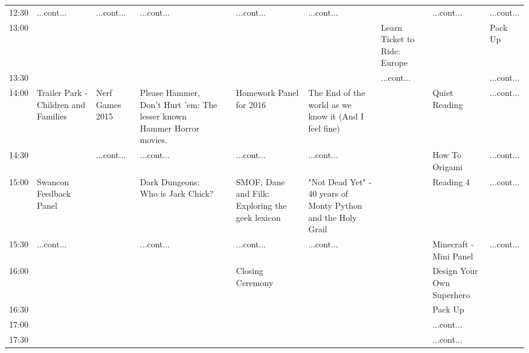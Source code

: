 \documentclass{scrreprt}
\begin{document}
\begin{landscape}
\begin{tabular}{c||p{25mm}|p{25mm}|p{25mm}|p{25mm}|p{25mm}|p{25mm}|p{25mm}|p{25mm}|p{25mm}|}
12:30&\cellcolor[gray]{0.959563} ...cont...&\cellcolor[gray]{0.822766} ...cont...&\cellcolor[gray]{0.536849} ...cont...&&\cellcolor[gray]{0.652774} ...cont...&\cellcolor[gray]{0.921723} ...cont...&&\cellcolor[gray]{0.933248} ...cont...&\cellcolor[gray]{0.511053} ...cont...\\
13:00&&&&&&&\cellcolor[gray]{0.990686} Learn Ticket to Ride: Europe&&\cellcolor[gray]{0.791956} Pack Up\\
13:30&&&&&&&\cellcolor[gray]{0.990686} ...cont...&&\cellcolor[gray]{0.791956} ...cont...\\
14:00&\cellcolor[gray]{0.975983} Trailer Park - Children and Families&\cellcolor[gray]{0.907521} Nerf Games 2015&\cellcolor[gray]{0.699067} Please Hammer, Don't Hurt 'em: The lesser known Hammer Horror movies.&&\cellcolor[gray]{0.630023} Homework Panel for 2016&\cellcolor[gray]{0.641491} The End of the world as we know it (And I feel fine)&&\cellcolor[gray]{0.787911} Quiet Reading&\cellcolor[gray]{0.791956} ...cont...\\
14:30&&\cellcolor[gray]{0.907521} ...cont...&\cellcolor[gray]{0.699067} ...cont...&&\cellcolor[gray]{0.630023} ...cont...&\cellcolor[gray]{0.641491} ...cont...&&\cellcolor[gray]{0.596810} How To Origami&\cellcolor[gray]{0.791956} ...cont...\\
15:00&\cellcolor[gray]{0.718915} Swancon Feedback Panel&&\cellcolor[gray]{0.702777} Dark Dungeons: Who is Jack Chick?&&\cellcolor[gray]{0.724284} SMOF, Dane and Filk: Exploring the geek lexicon&\cellcolor[gray]{0.798840} "Not Dead Yet" - 40 years of Monty Python and the Holy Grail&&\cellcolor[gray]{0.951650} Reading 4&\cellcolor[gray]{0.791956} ...cont...\\
15:30&\cellcolor[gray]{0.718915} ...cont...&&\cellcolor[gray]{0.702777} ...cont...&&\cellcolor[gray]{0.724284} ...cont...&\cellcolor[gray]{0.798840} ...cont...&&\cellcolor[gray]{0.973893} Minecraft - Mini Panel&\cellcolor[gray]{0.791956} ...cont...\\
16:00&&&&&\cellcolor[gray]{0.830238} Closing Ceremony&&&\cellcolor[gray]{0.693081} Design Your Own Superhero&\\
16:30&&&&&&&&\cellcolor[gray]{0.975113} Pack Up&\\
17:00&&&&&&&&\cellcolor[gray]{0.975113} ...cont...&\\
17:30&&&&&&&&\cellcolor[gray]{0.975113} ...cont...&\\\end{tabular}\end{landscape}
\end{document}
